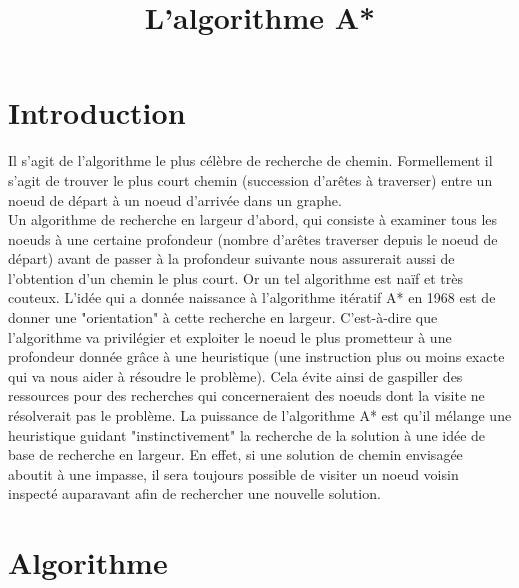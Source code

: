 \documentclass[a4paper,11pt]{article}
\title{L'algorithme A*}
\author{}
\date{}
\begin{document}
\maketitle

\section{Introduction}
Il s'agit de l'algorithme le plus célèbre de recherche de chemin. Formellement il s'agit de trouver le plus court chemin (succession d'arêtes à traverser) entre un noeud de départ à un noeud d'arrivée dans un graphe. \\
Un algorithme de recherche en largeur d'abord, qui consiste à examiner tous les noeuds à une certaine profondeur (nombre d'arêtes traverser depuis le noeud de départ) avant de passer à la profondeur suivante nous assurerait aussi de l'obtention d'un chemin le plus court. Or un tel algorithme est naïf et très couteux.
L'idée qui a donnée naissance à l'algorithme itératif A* en 1968 est de donner une "orientation" à cette recherche en largeur. C'est-à-dire que l'algorithme va privilégier et exploiter le noeud le plus prometteur à une profondeur donnée grâce à une heuristique (une instruction plus ou moins exacte qui va nous aider à résoudre le problème). Cela évite ainsi de gaspiller des ressources pour des recherches qui concerneraient des noeuds dont la visite ne résolverait pas le problème. La puissance de l'algorithme A* est qu'il mélange une heuristique guidant "instinctivement" la recherche de la solution à une idée de base de recherche en largeur. En effet, si une solution de chemin envisagée aboutit à une impasse, il sera toujours possible de visiter un noeud voisin inspecté auparavant afin de rechercher une nouvelle solution. \\

\section{Algorithme}
\end{document}
